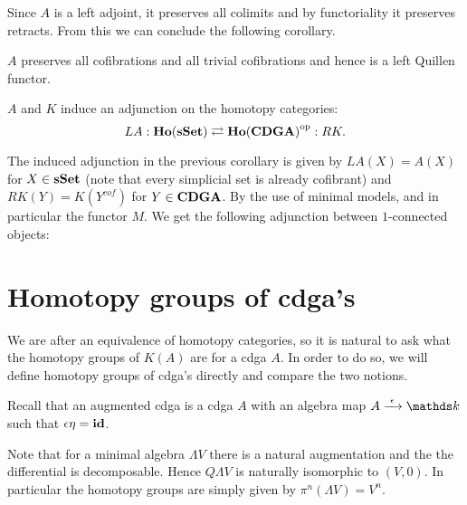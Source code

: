 Since $A$ is a left adjoint, it preserves all colimits and by functoriality it preserves retracts. From this we can conclude the following corollary.

\begin{corollary}
	$A$ preserves all cofibrations and all trivial cofibrations and hence is a left Quillen functor.
\end{corollary}

\begin{corollary}
	$A$ and $K$ induce an adjunction on the homotopy categories:
	$$ LA : \mathbf{Ho}(\mathbf{s{\mathbf{Set}}}) \rightleftarrows {\mathbf{Ho}(\mathbf{CDGA})}^{\text{op}} : RK. $$
\end{corollary}

The induced adjunction in the previous corollary is given by $LA(X) = A(X)$ for $X \in \mathbf{s{\mathbf{Set}}}$ (note that every simplicial set is already cofibrant) and $RK(Y) = K(Y^{cof})$ for $Y \in \mathbf{CDGA}$. By the use of minimal models, and in particular the functor $M$. We get the following adjunction between $1$-connected objects:



\section{Homotopy groups of cdga's}
We are after an equivalence of homotopy categories, so it is natural to ask what the homotopy groups of $K(A)$ are for a cdga $A$. In order to do so, we will define homotopy groups of cdga's directly and compare the two notions.

Recall that an augmented cdga is a cdga $A$ with an algebra map $A \tot{\counit} \k$ such that $\epsilon \eta = \mathbf{id}$.


Note that for a minimal algebra $\Lambda V$ there is a natural augmentation and the the differential is decomposable. Hence $Q \Lambda V$ is naturally isomorphic to $(V, 0)$. In particular the homotopy groups are simply given by $\pi^n(\Lambda V) = V^n$.

